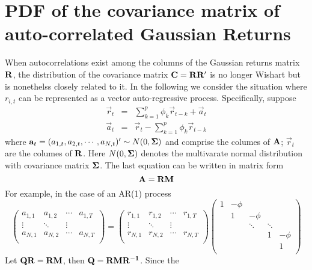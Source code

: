 \chapter{PDF of the covariance matrix of
auto-correlated Gaussian Returns}
\label{app:pdf_gaussian1}
When autocorrelations exist among the columns of the Gaussian returns
matrix $\mathbf{R}$, the distribution of the covariance matrix $\mathbf{C} =
\mathbf{R} \mathbf{R'}$ is no longer Wishart but is nonethelss closely
related to it. In the following we consider the situation where
$r_{i,t}$ can be represented as a vector auto-regressive
process. Specifically, suppose
\begin{eqnarray*}
  \vec{r}_t &=& \sum_{k=1}^p \phi_k \vec{r}_{t-k} + \vec{a}_t \\
  \vec{a}_t &=& \vec{r}_t - \sum_{k=1}^p \phi_k \vec{r}_{t-k}
\end{eqnarray*}
where $\mathbf{a}_t = (a_{1,t}, a_{2,t}, \cdots, a_{N,t})' \sim N(0,
\mathbf{\Sigma})$ and comprise the columes of $\mathbf{A}$; $\vec{r}_t$ are the
columes of $\mathbf{R}$. Here $N(0, \mathbf{\Sigma})$ denotes the multivarate
normal distribution with covariance matrix $\mathbf{\Sigma}$. The last equation
can be written in matrix form
\[
\mathbf{A} = \mathbf{R M}
\]
For example, in the case of an AR(1) process
\begin{equation*}
  \begin{pmatrix}
    a_{1,1} & a_{1,2} & \cdots & a_{1,T} \\
    \vdots & \ddots & \vdots \\
    a_{N,1} & a_{N,2} & \cdots & a_{N,T} \\
  \end{pmatrix} =
  \begin{pmatrix}
    r_{1,1} & r_{1,2} & \cdots & r_{1,T} \\
    \vdots & \ddots & \vdots \\
    r_{N,1} & r_{N,2} & \cdots & r_{N,T} \\
  \end{pmatrix}
  \begin{pmatrix}
    1 & -\phi &   &   & \\
      & 1 & -\phi &   & \\
      &   & \ddots  & \ddots &   \\
      &   &   & 1 & -\phi \\
      &   &   &   & 1 \\
  \end{pmatrix}
\end{equation*}
Let $\mathbf{QR} = \mathbf{RM}$, then $\mathbf{Q} = \mathbf{RMR^{-1}}$. Since the
